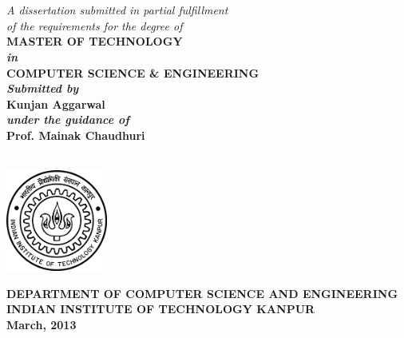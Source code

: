 \thispagestyle{empty}
\begin{singlespace}
\begin{center}
\\
\vspace{4mm}
\\
\vspace{25mm}
\normalsize
\emph{A dissertation submitted in partial fulfillment} \\
\emph{of the requirements for the degree of} \\
\vspace{20pt}
\bfseries MASTER OF TECHNOLOGY \\
\vspace{10pt}
\emph {in}\\
\vspace{10pt}
\bfseries COMPUTER SCIENCE \& ENGINEERING \\
\vspace{20pt}
\emph {Submitted by}\\
\vspace{10pt}
{\bf{\Large Kunjan Aggarwal}}\\
\vspace{10mm}
\emph{under the guidance of}\\
\vspace{5mm}
{\bf{\Large Prof. Mainak Chaudhuri}}\\
\ \\
\vspace{25mm}

\begin{center}
\centering
\includegraphics[width=0.25\textwidth]{./Data/iitk}
\end{center}

\vspace{3mm}
{\bf {\large {\sc DEPARTMENT OF COMPUTER SCIENCE AND ENGINEERING}}}\\
\vspace{2mm}
{\bf {\large {\sc INDIAN INSTITUTE OF TECHNOLOGY KANPUR}}}\\
\vspace{3mm}
{\textbf{ March, 2013}}\\
\end{center}
\end{singlespace}
